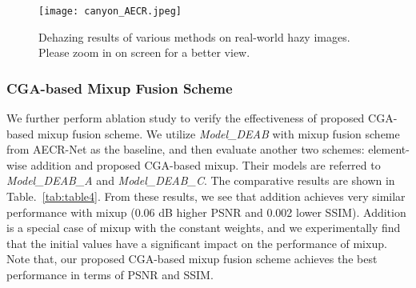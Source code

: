 \documentclass[lettersize,journal]{IEEEtran}
\begin{document}
\begin{figure*}[p]
{\begin{minipage}[c]{0.12\textwidth}
			\texttt{[image: canyon\_AECR.jpeg]}\vspace{2pt}
		\end{minipage}
	}	
\hspace{-9pt}
\hspace{-9pt}
\caption{Dehazing results of various methods on real-world hazy images. Please zoom in on screen for a better view.}
	\label{fig:Comparison_Real}
\end{figure*}




\subsubsection[3]{CGA-based Mixup Fusion Scheme}
\label{subsec: CGA-based Mixup Fusion Scheme}
We further perform ablation study to verify the effectiveness of proposed CGA-based mixup fusion scheme.
We utilize \textit{Model\_DEAB} with mixup fusion scheme from AECR-Net \cite{wu2021CVPR} as the baseline, and then evaluate another two schemes: element-wise addition \cite{dong2020CVPR,bai2022TIP,ye2022ECCVORAL} and proposed CGA-based mixup.
Their models are referred to \textit{Model\_DEAB\_A} and \textit{Model\_DEAB\_C}.
The comparative results are shown in Table.~\ref{tab:table4}.
From these results, we see that addition achieves very similar performance with mixup (0.06 dB higher PSNR and 0.002 lower SSIM).
Addition is a special case of mixup with the constant weights, and we experimentally find that the initial values have a significant impact on the performance of mixup.
Note that, our proposed CGA-based mixup fusion scheme achieves the best performance in terms of PSNR and SSIM.
\end{document}
